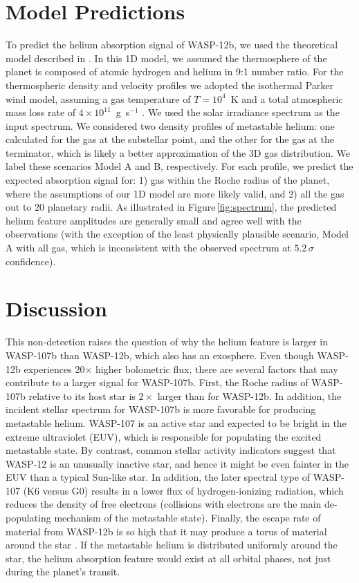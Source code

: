 \documentclass[RNAAS]{aastex62}
\begin{document}
\section{Model Predictions}
To predict the helium absorption signal of WASP-12b,
we used the theoretical model described in \cite{oklopcic18}.
In this 1D model, we assumed the thermosphere of the planet is composed of atomic hydrogen and helium in 9:1 number
ratio. For the thermospheric density and velocity profiles we adopted the
isothermal Parker wind model, assuming a gas temperature of $T=10^4$~K and a  
total atmospheric mass loss rate of $4\times 10^{11}$~g~s$^{-1}$ \citep[based on
hydrodynamic simulations of atmospheric escape in WASP-12b
from][]{salz16}. We used the solar irradiance spectrum as the input spectrum. 
We considered two density profiles of metastable helium: one calculated for the
gas at the substellar point, and the other for the
gas at the terminator, which is likely a better approximation of the 3D
gas distribution. We label these scenarios Model A and B,
respectively. For each profile, we predict the expected absorption signal for: 1) gas within the Roche radius of the planet, where the assumptions of our 1D model are more likely valid, and 2) all the gas out to 20 planetary radii. 
As illustrated in Figure\,\ref{fig:spectrum}, the predicted helium feature
amplitudes are generally small and agree well with the observations (with the
exception of the least physically plausible scenario, Model A with all gas,
which is inconsistent with the observed spectrum at $5.2\,\sigma$ confidence). 


\section{Discussion}
This non-detection raises the question of why the helium feature is larger in  
WASP-107b than WASP-12b, which also has an exosphere.  Even though
WASP-12b experiences 20$\times$ higher bolometric flux, there are several factors that may contribute to a
larger signal for WASP-107b. First, the Roche radius of WASP-107b relative to
its host star is $2\times$ larger than for WASP-12b. In addition, the incident stellar spectrum for WASP-107b
is more favorable for producing metastable helium.  WASP-107 is an active star
and expected to be bright in the extreme ultraviolet (EUV), which is responsible for populating the excited metastable
state. By contrast, common stellar activity indicators suggest that WASP-12
is an unusually inactive star, and hence it might be even fainter in the EUV
than a typical Sun-like star.  In addition, the later spectral type of WASP-107 (K6 versus G0) results
in a lower flux of hydrogen-ionizing radiation, which reduces the density of
free electrons (collisions with electrons are the main de-populating mechanism
of the metastable state).  Finally, the escape rate of material from WASP-12b is
so high that it may produce a torus of material around the star
\citep{haswell17, debrecht18}. If the metastable helium is distributed uniformly
around the star, the helium absorption feature would exist at all orbital phases, not just during the planet's transit.
\end{document}
